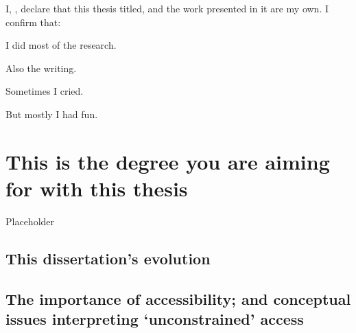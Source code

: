 \documentclass[
11pt, %
oneside, %
english, %
singlespacing, %
]{macthesis} %
\begin{document}

\begin{declaration}
\addchaptertocentry{\authorshipname}

\noindent I, \authorname, declare that this thesis titled, \emph{\ttitle} and the work presented in it are my own. I confirm that:

I did most of the research.

Also the writing.

Sometimes I cried.

But mostly I had fun.

\end{declaration}


\label{lastoffront}
\clearpage


\mainmatter %
\pagestyle{thesis}
\chapter{This is the degree you are aiming for with this thesis}\label{this-is-the-degree-you-are-aiming-for-with-this-thesis}

Placeholder

\section{This dissertation's evolution}\label{this-dissertations-evolution}

\section{The importance of accessibility; and conceptual issues interpreting `unconstrained' access}\label{the-importance-of-accessibility-and-conceptual-issues-interpreting-unconstrained-access}
\end{document}
